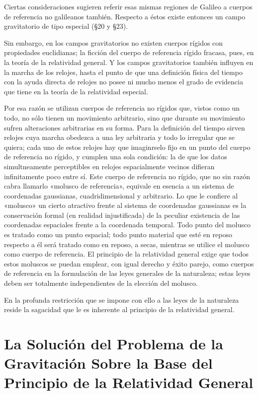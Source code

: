 \documentclass[spanish]{book}
\begin{document}
Ciertas consideraciones sugieren referir esas mismas regiones de Galileo a cuerpos
de referencia no galileanos también. Respecto a éstos existe entonces un campo
gravitatorio de tipo especial (\S 20 y \S 23).

Sin embargo, en los campos gravitatorios no existen cuerpos rígidos con propiedades
euclidianas; la ficción del cuerpo de referencia rígido fracasa, pues, en la teoría de la
relatividad general. Y los campos gravitatorios también influyen en la marcha de los
relojes, hasta el punto de que una definición física del tiempo con la ayuda directa de
relojes no posee ni mucho menos el grado de evidencia que tiene en la teoría de la
relatividad especial.

Por esa razón se utilizan cuerpos de referencia no rígidos que, vistos como un todo,
no sólo tienen un movimiento arbitrario, sino que durante su movimiento sufren
alteraciones arbitrarias en su forma. Para la definición del tiempo sirven relojes cuya
marcha obedezca a una ley arbitraria y todo lo irregular que se quiera; cada uno de estos
relojes hay que imaginrselo fijo en un punto del cuerpo de referencia no rígido, y
cumplen una sola condición: la de que los datos simultneamente perceptibles en relojes
espacialmente vecinos difieran infinitamente poco entre sí. Este cuerpo de referencia
no rígido, que no sin razón cabra llamarlo «molusco de referencia», equivale en
esencia a un sistema de coordenadas gaussianas, cuadridimensional y arbitrario. Lo que
le confiere al «molusco» un cierto atractivo frente al sistema de coordenadas gaussianas
es la conservación formal (en realidad injustificada) de la peculiar existencia de
las coordenadas espaciales frente a la coordenada temporal. Todo punto del molusco es
tratado como un punto espacial; todo punto material que esté en reposo respecto a él
será tratado como en reposo, a secas, mientras se utilice el molusco como cuerpo de
referencia. El principio de la relatividad general exige que todos estos moluscos se
puedan emplear, con igual derecho y éxito parejo, como cuerpos de referencia en la
formulación de las leyes generales de la naturaleza; estas leyes deben ser totalmente
independientes de la elección del molusco.

En la profunda restricción que se impone con ello a las leyes de la naturaleza reside la
sagacidad que le es inherente al principio de la relatividad general.


\chapter{La Solución del Problema de la Gravitación Sobre la Base
del Principio de la Relatividad General}
\end{document}
